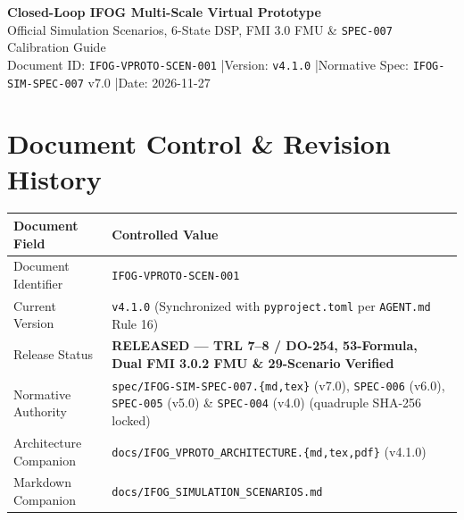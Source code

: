 \documentclass[11pt,a4paper]{article}
\newcommand{\DocID}{IFOG-VPROTO-SCEN-001}
\newcommand{\DocVersion}{v4.1.0}
\newcommand{\DocDate}{2026-11-27}
\begin{document}
\begin{tcolorbox}[colback=NavyBlue,colframe=NavyBlue,arc=4pt,boxrule=0pt,left=12pt,right=12pt,top=10pt,bottom=10pt]
{\color{white}\Large\bfseries Closed-Loop IFOG Multi-Scale Virtual Prototype}\\[4pt]
{\color{white}\large Official Simulation Scenarios, 6-State DSP, FMI 3.0 FMU \& \texttt{SPEC-007} Calibration Guide}\\[6pt]
{\color{white}\small Document ID: \texttt{\DocID} \quad|\quad Version: \texttt{\DocVersion} \quad|\quad Normative Spec: \texttt{IFOG-SIM-SPEC-007} v7.0 \quad|\quad Date: \DocDate}
\end{tcolorbox}

\section{Document Control \& Revision History}

\small
\begin{tabularx}{\textwidth}{@{}p{3.6cm} X@{}}
\toprule
\textbf{Document Field} & \textbf{Controlled Value} \\
\midrule
Document Identifier & \texttt{\DocID} \\
Current Version & \texttt{\DocVersion} (Synchronized with \texttt{pyproject.toml} per \texttt{AGENT.md} Rule 16) \\
Release Status & \textcolor{TealDark}{\textbf{RELEASED --- TRL 7--8 / DO-254, 53-Formula, Dual FMI 3.0.2 FMU \& 29-Scenario Verified}} \\
Normative Authority & \texttt{spec/IFOG-SIM-SPEC-007.\{md,tex\}} (v7.0), \texttt{SPEC-006} (v6.0), \texttt{SPEC-005} (v5.0) \& \texttt{SPEC-004} (v4.0) (quadruple SHA-256 locked) \\
Architecture Companion & \texttt{docs/IFOG\_VPROTO\_ARCHITECTURE.\{md,tex,pdf\}} (\DocVersion) \\
Markdown Companion & \texttt{docs/IFOG\_SIMULATION\_SCENARIOS.md} \\
\bottomrule
\end{tabularx}
\end{document}
